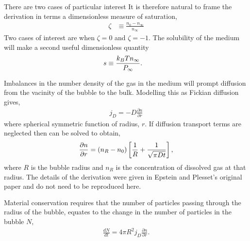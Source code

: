 There are two cases of particular interest
It is therefore natural to frame the derivation in terms a dimensionless measure of saturation,
\begin{align}
  \zeta &\equiv \frac{n_0 - n_\infty}{n_\infty }\label{eqn:nuc:saturation}
\end{align}
Two cases of interest are  when $\zeta = 0$ and $\zeta = -1$.
The solubility of the medium will make a second useful dimensionless quantity\cite{Gor2011}
\begin{align}
  s &\equiv \frac{k_B T n_\infty}{P_\infty} \label{eqn:nuc:solubility}.
\end{align}

Imbalances in the number density of the gas in the medium will prompt diffusion from the vacinity of the bubble to the bulk.
Modelling this as Fickian diffusion gives,
\begin{align}
  j_D = -D \frac{\partial n}{\partial r}
  \label{eqn:nuc:Fickian}
\end{align}
where spherical symmetric function of radius, $r$.
If diffusion transport terms are neglected then  can be solved to obtain,
\begin{align}
  \frac{\partial n}{\partial r} = \left( n_R - n_0 \right)\left[ \frac{1}{R} + \frac{1}{\sqrt{\pi D t}} \right],
\end{align}
where $R$ is the bubble radius and $n_R$ is the concentration of dissolved gas at that radius.
The details of the derivation were given in Epstein and Plesset's \cite{Epstein1950} original paper and do not need to be reproduced here.

Material conservation requires that the number of particles passing through the radius of the bubble, 
equates to the change in the number of particles in the bubble $N$,
\begin{align}
  \frac{dN}{dt} =4 \pi R^2 j_D\frac{\partial n}{\partial r}.
\label{eqn:nuc:materialCons}
\end{align}

